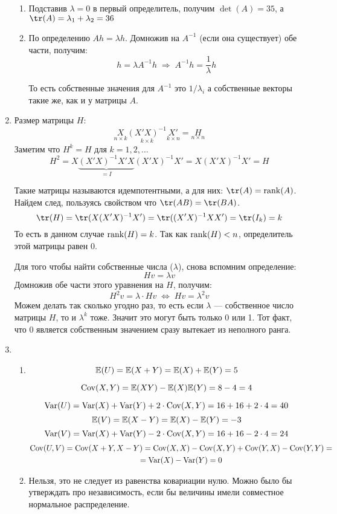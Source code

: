\documentclass[12pt, a4paper]{article}
\theoremstyle{definition}
\begin{document}
\begin{enumerate}
\begin{enumerate}
  \item Подставив $\lambda = 0$ в первый определитель, получим $\det(A)=35$, а $\tr(A) = \lambda_1 + \lambda_2 = 36$

  \item По определению $Ah = \lambda h$. Домножив на $A^{-1}$ (если она существует) обе части, получим:
  \[
  h = \lambda A^{-1} h \; \Rightarrow \; A^{-1}h = \frac{1}{\lambda}h
  \]



  То есть собственные значения для $A^{-1}$ это $1/\lambda_i$ а собственные векторы такие же, как и у матрицы $A$.
  \end{enumerate}



\item
  Размер матрицы $H$:
  \[
  \underset{n\times k}{X} \underset{k\times k}{(X'X)^{-1}} \underset{k\times n}{X'} = \underset{n\times n}{H}
  \]
  Заметим что $H^k = H$ для $k = 1,2,\ldots$
  \[
  H^2 = X\underbrace{(X'X)^{-1}X'X}_{{}=I}(X'X)^{-1}X' = X(X'X)^{-1}X' = H
  \]

  Такие матрицы называются идемпотентными, а для них: $\tr(A) = \rank(A)$. Найдем след, пользуясь свойством что $\tr(AB) = \tr(BA)$.
  \[
  \tr(H) = \tr(X(X'X)^{-1}X') = \tr((X'X)^{-1}XX') = \tr(I_k) = k
  \]
  То есть в данном случае $\operatorname{rank}(H) = k$. Так как $\operatorname{rank}(H) < n$, определитель этой матрицы равен 0.

  Для того чтобы найти собственные числа ($\lambda$), снова вспомним определение:
  \[
  Hv = \lambda v
  \]
  Домножив обе части этого уравнения на $H$, получим:
  \[
  H^2v = \lambda\cdot Hv \; \Leftrightarrow \; Hv = \lambda^2v
  \]
  Можем делать так сколько угодно раз, то есть если $\lambda$ — собственное число матрицы $H$, то и $\lambda^k$ тоже. Значит это могут быть только 0 или 1. Тот факт, что 0 является собственным значением сразу вытекает из неполного ранга.



\item
  \begin{enumerate}
  \item
  \[
  \mathbb{E}(U) = \mathbb{E}(X+Y) = \mathbb{E}(X) + \mathbb{E}(Y) = 5
  \]

  \[
  \operatorname{Cov}(X,Y) = \mathbb{E}(XY) - \mathbb{E}(X)\mathbb{E}(Y) = 8 - 4 = 4
  \]

  \[
  \operatorname{Var}(U) = \operatorname{Var}(X) + \operatorname{Var}(Y) + 2\cdot \operatorname{Cov}(X, Y)= 16 + 16 + 2\cdot 4 = 40
  \]
  \[
  \mathbb{E}(V) = \mathbb{E}(X-Y) = \mathbb{E}(X) - \mathbb{E}(Y) = -3
  \]
  \[
  \operatorname{Var}(V) = \operatorname{Var}(X) + \operatorname{Var}(Y) - 2\cdot \operatorname{Cov}(X, Y)= 16 + 16 - 2\cdot 4 = 24
  \]
  \begin{multline}
  \operatorname{Cov}(U, V) = \operatorname{Cov}(X + Y, X-Y) = \operatorname{Cov}(X,X) - \operatorname{Cov}(X,Y) + \operatorname{Cov}(Y,X) - \operatorname{Cov}(Y,Y)= \\
   = \operatorname{Var}(X)-\operatorname{Var}(Y) = 0
  \end{multline}
  \item Нельзя, это не следует из равенства ковариации нулю. Можно было бы утверждать про независимость, если бы величины имели совместное нормальное распределение.


\end{enumerate}
\end{enumerate}
\end{document}
